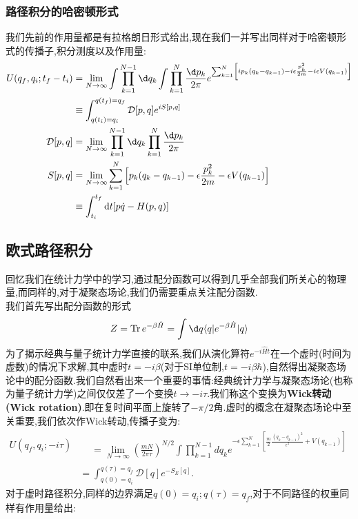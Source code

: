\subsubsection{路径积分的哈密顿形式}
我们先前的作用量都是有拉格朗日形式给出,现在我们一并写出同样对于哈密顿形式的传播子,积分测度以及作用量:
\begin{equation}
	\begin{aligned}
		U(q_f,q_i;t_f-t_i)&=\lim_{N\to\infty}\int\prod_{k=1}^{N-1}\d q_{k}\int\prod_{k=1}^{N}\frac{\d p_{k}}{2\pi}e^{\sum_{k=1}^{N}\left[ip_{k}(q_{k}-q_{k-1})-i\epsilon\frac{p_{k}^{2}}{2m}-i\epsilon V(q_{k-1})\right]}\\
		&\equiv\int_{q(t_i)=q_i}^{q(t_f)=q_f}\mathcal{D}[p,q] e^{iS[p,q]} \\
		\mathcal{D}[p,q]&=\lim_{N\to\infty}\prod_{k=1}^{N-1}\d q_k\prod_{k=1}^N\frac{\d p_k}{2\pi}\\
		S[p,q]&=\lim_{N\to\infty}\sum_{k=1}^N\Big[p_k(q_k-q_{k-1})-\epsilon\frac{p_k^2}{2m}-\epsilon V(q_{k-1})\Big] \\
		&\equiv\int_{t_i}^{t_f}\dt [p\dot{q}-H(p,q)]
	\end{aligned}
\end{equation}








\subsection{欧式路径积分}
回忆我们在统计力学中的学习,通过配分函数可以得到几乎全部我们所关心的物理量,而同样的,对于凝聚态场论,我们仍需要重点关注配分函数.\\
我们首先写出配分函数的形式
\begin{equation}
	Z=\operatorname{Tr}e^{{-\beta\hat{H}}}=\int \d q\langle q|e^{{-\beta\hat{H}}}|q\rangle
\end{equation}
为了揭示经典与量子统计力学直接的联系,我们从演化算符$e^{-i\hat{H}t}$在一个虚时(时间为虚数)的情况下求解,其中虚时$t=-i\beta$(对于SI单位制,$t=-i\beta\hbar$),自然得出凝聚态场论中的配分函数.我们自然看出来一个重要的事情:经典统计力学与凝聚态场论(也称为量子统计力学)之间仅仅差了一个变换$t\to-i\tau$.我们称这个变换为\textbf{Wick转动(Wick rotation)}.即在复时间平面上旋转了$-\pi/2$角.虚时的概念在凝聚态场论中至关重要,我们依次作Wick转动,传播子变为:
\begin{equation}
	\begin{aligned}
		U(q_f,q_i;-i\tau)& \begin{aligned}&=\lim_{N\to\infty}\left(\frac{mN}{2\pi\tau}\right)^{N/2}\int\prod_{k=1}^{N-1}dq_k e^{-\epsilon\sum_{k=1}^N\left[\frac{m}{2}\frac{\left(q_k-q_{k-1}\right)^2}{\epsilon^2}+V\left(q_{k-1}\right)\right]}\end{aligned} \\
		&=\int_{q(0)=q_i}^{q(\tau)=q_f}\mathcal{D}[q] e^{-S_E[q]}.
	\end{aligned}
\end{equation}
对于虚时路径积分,同样的边界满足$q(0)=q_i;q(\tau)=q_f$,对于不同路径的权重同样有作用量给出:\\

